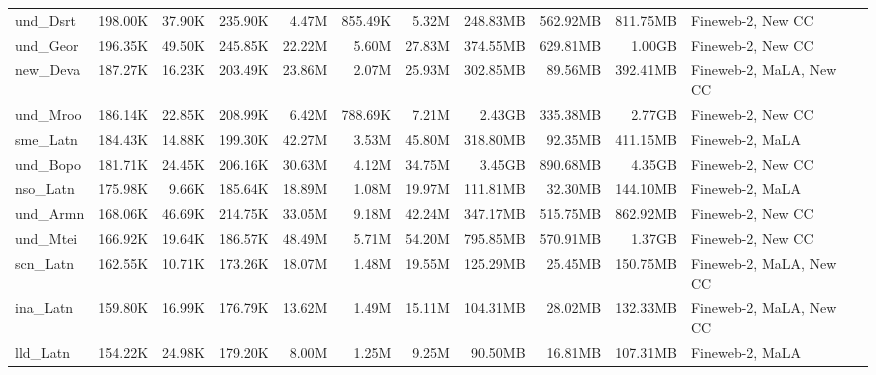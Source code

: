 \begin{table*}[!htp]
{\begin{tabular}{l|rrr|rrr|rrr|l}
und\_Dsrt                   & 198.00K    & 37.90K       & 235.90K     & 4.47M        & 855.49K        & 5.32M         & 248.83MB   & 562.92MB     & 811.75MB    & Fineweb-2, New CC       \\
und\_Geor                   & 196.35K    & 49.50K       & 245.85K     & 22.22M       & 5.60M          & 27.83M        & 374.55MB   & 629.81MB     & 1.00GB      & Fineweb-2, New CC       \\
new\_Deva                   & 187.27K    & 16.23K       & 203.49K     & 23.86M       & 2.07M          & 25.93M        & 302.85MB   & 89.56MB      & 392.41MB    & Fineweb-2, MaLA, New CC \\
und\_Mroo                   & 186.14K    & 22.85K       & 208.99K     & 6.42M        & 788.69K        & 7.21M         & 2.43GB     & 335.38MB     & 2.77GB      & Fineweb-2, New CC       \\
sme\_Latn                   & 184.43K    & 14.88K       & 199.30K     & 42.27M       & 3.53M          & 45.80M        & 318.80MB   & 92.35MB      & 411.15MB    & Fineweb-2, MaLA         \\
und\_Bopo                   & 181.71K    & 24.45K       & 206.16K     & 30.63M       & 4.12M          & 34.75M        & 3.45GB     & 890.68MB     & 4.35GB      & Fineweb-2, New CC       \\
nso\_Latn                   & 175.98K    & 9.66K        & 185.64K     & 18.89M       & 1.08M          & 19.97M        & 111.81MB   & 32.30MB      & 144.10MB    & Fineweb-2, MaLA         \\
und\_Armn                   & 168.06K    & 46.69K       & 214.75K     & 33.05M       & 9.18M          & 42.24M        & 347.17MB   & 515.75MB     & 862.92MB    & Fineweb-2, New CC       \\
und\_Mtei                   & 166.92K    & 19.64K       & 186.57K     & 48.49M       & 5.71M          & 54.20M        & 795.85MB   & 570.91MB     & 1.37GB      & Fineweb-2, New CC       \\
scn\_Latn                   & 162.55K    & 10.71K       & 173.26K     & 18.07M       & 1.48M          & 19.55M        & 125.29MB   & 25.45MB      & 150.75MB    & Fineweb-2, MaLA, New CC \\
ina\_Latn                   & 159.80K    & 16.99K       & 176.79K     & 13.62M       & 1.49M          & 15.11M        & 104.31MB   & 28.02MB      & 132.33MB    & Fineweb-2, MaLA, New CC \\
lld\_Latn                   & 154.22K    & 24.98K       & 179.20K     & 8.00M        & 1.25M          & 9.25M         & 90.50MB    & 16.81MB      & 107.31MB    & Fineweb-2, MaLA         \\

\end{tabular}}
\end{table*}
